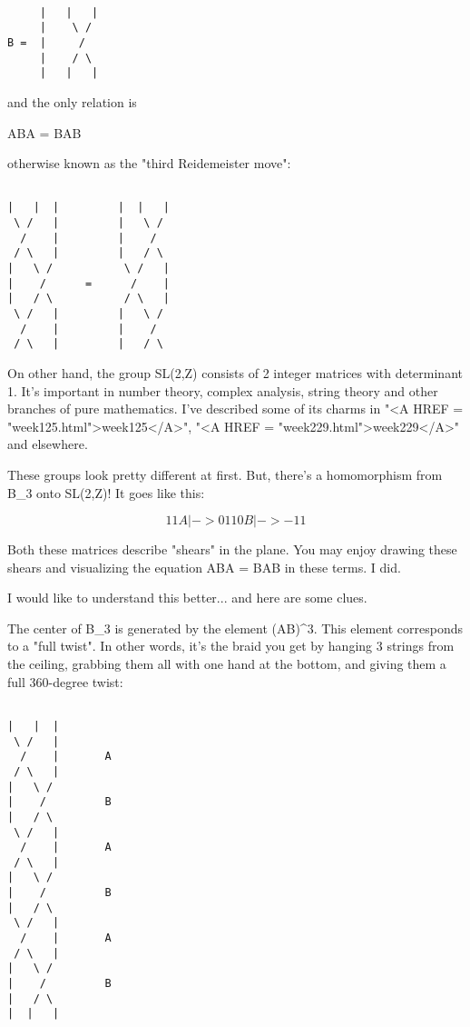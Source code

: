\begin{verbatim}

     |   |   |   
     |    \ /    
B =  |     /    
     |    / \  
     |   |   |
\end{verbatim}
    
and the only relation is

ABA = BAB

otherwise known as the "third Reidemeister move":


\begin{verbatim}

|   |  |         |  |   | 
 \ /   |         |   \ /
  /    |         |    / 
 / \   |         |   / \
|   \ /           \ /   |  
|    /      =      /    | 
|   / \           / \   | 
 \ /   |         |   \ / 
  /    |         |    /
 / \   |         |   / \  
\end{verbatim}
    
On other hand, the group SL(2,Z) consists of 2 integer matrices with
determinant 1.  It's important in number theory, complex analysis,
string theory and other branches of pure mathematics.  I've described
some of its charms in "<A HREF =
"week125.html">week125</A>", "<A HREF =
"week229.html">week229</A>" and elsewhere.

These groups look pretty different at first.  But, there's a 
homomorphism from B_{3} onto SL(2,Z)!  It goes like this:


$$

        1   1
A |->  
        0   1


        1   0
B |->  
       -1   1
$$
    

Both these matrices describe "shears" in the plane.  
You may enjoy drawing these shears and visualizing the equation 
ABA = BAB in these terms.  I did.

I would like to understand this better... and here are some clues.

The center of B_{3} is generated by the element (AB)^{3}.  
This element corresponds to a "full twist".  In other words, it's
the braid you get by hanging 3 strings from the ceiling, grabbing 
them all with one hand at the bottom, and giving them a full 360-degree 
twist:


\begin{verbatim}

|   |  |  
 \ /   | 
  /    |       A
 / \   |
|   \ /    
|    /         B 
|   / \   
 \ /   | 
  /    |       A
 / \   |
|   \ /    
|    /         B 
|   / \   
 \ /   | 
  /    |       A
 / \   |
|   \ /    
|    /         B 
|   / \   
|  |   |
\end{verbatim}
    
